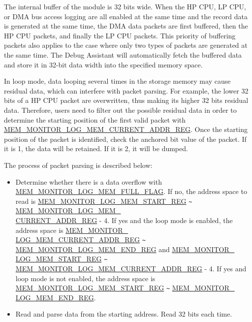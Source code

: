 \documentclass[main\_\_EN.tex]{subfiles}
\begin{document}
The internal buffer of the module is 32 bits wide. When the HP CPU, LP CPU, or DMA bus access logging are all enabled at the same time and the record data is generated at the same time, the DMA data packets are first buffered, then the HP CPU packets, and finally the LP CPU packets. This priority of buffering packets also applies to the case where only two types of packets are generated at the same time. The Debug Assistant will automatically fetch the buffered data and store it in 32-bit data width into the specified memory space.

In loop mode, data looping several times in the storage memory may cause residual data, which can interfere with packet parsing. For example, the lower 32 bits of a HP CPU packet are overwritten, thus making its higher 32 bits residual data. Therefore, users need to filter out the possible residual data in order to determine the starting position of the first valid packet with \hyperref[regdesc:MEMMONITORLOGMEMCURRENTADDRREG]{MEM\_MONITOR\_LOG\_MEM\_CURRENT\_ADDR\_REG}. Once the starting position of the packet is identified, check the anchored bit value of the packet. If it is 1, the data will be retained. If it is 2, it will be dumped. 

The process of packet parsing is described below:

\begin{itemize}
    \item Determine whether there is a data overflow with \hyperref[fielddesc:MEMMONITORLOGMEMFULLFLAG]{MEM\_MONITOR\_LOG\_MEM\_FULL\_FLAG}. If no, the address space to read is \hyperref[regdesc:MEMMONITORLOGMEMSTARTREG]{MEM\_MONITOR\_LOG\_MEM\_START\_REG}  \verb+~+ \hyperref[regdesc:MEMMONITORLOGMEMCURRENTADDRREG]{MEM\_MONITOR\_LOG\_MEM\_\\CURRENT\_ADDR\_REG} - 4. If yes and the loop mode is enabled, the address space is \hyperref[regdesc:MEMMONITORLOGMEMCURRENTADDRREG]{MEM\_MONITOR\_\\LOG\_MEM\_CURRENT\_ADDR\_REG} \verb+~+ \hyperref[regdesc:MEMMONITORLOGMEMENDREG]{MEM\_MONITOR\_LOG\_MEM\_END\_REG} and
    \hyperref[regdesc:MEMMONITORLOGMEMSTARTREG]{MEM\_MONITOR\_\\LOG\_MEM\_START\_REG}  \verb+~+ \hyperref[regdesc:MEMMONITORLOGMEMCURRENTADDRREG]{MEM\_MONITOR\_LOG\_MEM\_CURRENT\_ADDR\_REG} - 4. If yes and loop mode is not enabled, the address space is \hyperref[regdesc:MEMMONITORLOGMEMSTARTREG]{MEM\_MONITOR\_LOG\_MEM\_START\_REG} \verb+~+ \hyperref[regdesc:MEMMONITORLOGMEMENDREG]{MEM\_MONITOR\_\\LOG\_MEM\_END\_REG}.
    
    \item Read and parse data from the starting address. Read 32 bits each time.
\end{itemize}
\end{document}
